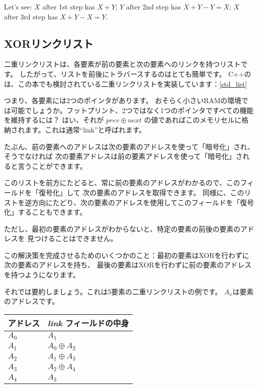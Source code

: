 Let's see:
$X$ after 1st step has $X+Y$;
$Y$ after 2nd step has $X+Y-Y=X$;
$X$ after 3rd step has $X+Y-X=Y$.

\subsection{XORリンクリスト}

二重リンクリストは、各要素が前の要素と次の要素へのリンクを持つリストです。
したがって、リストを前後にトラバースするのはとても簡単です。 
C++のは、この本でも検討されている二重リンクリストを実装しています：\ref{std_list}

つまり、各要素には2つのポインタがあります。
おそらく小さい\ac{RAM}の環境では可能でしょうか。フットプリント、2つではなく1つのポインタですべての機能を維持するには？
はい、それが $prev \oplus next$ の値であればこのメモリセルに格納されます。これは通常``link''と呼ばれます。

たぶん、前の要素へのアドレスは次の要素のアドレスを使って「暗号化」され、そうでなければ
次の要素アドレスは前の要素アドレスを使って「暗号化」されると言うことができます。

このリストを前方にたどると、常に前の要素のアドレスがわかるので、このフィールドを「復号化」して
次の要素のアドレスを取得できます。
同様に、このリストを逆方向にたどり、次の要素のアドレスを使用してこのフィールドを「復号化」することもできます。

ただし、最初の要素のアドレスがわからないと、特定の要素の前後の要素のアドレスを
見つけることはできません。

この解決策を完成させるためのいくつかのこと：最初の要素はXORを行わずに次の要素のアドレスを持ち、
最後の要素はXORを行わずに前の要素のアドレスを持つようになります。

それでは要約しましょう。これは5要素の二重リンクリストの例です。 
$A_x$は要素のアドレスです。

\begin{center}
\begin{tabular}{ | l | l | }
	\hline
	\HeaderColor アドレス & \HeaderColor \emph{link} フィールドの中身 \\
	\hline
	$A_0$ & $A_1$ \\
	\hline
	$A_1$ & $A_0 \oplus A_2$ \\
	\hline
	$A_2$ & $A_1 \oplus A_3$ \\
	\hline
	$A_3$ & $A_2 \oplus A_4$ \\
	\hline
	$A_4$ & $A_3$ \\
	\hline
\end{tabular}
\end{center}

